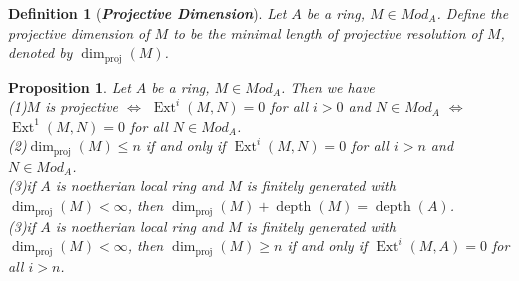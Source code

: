 \documentclass{ctexart}
\newtheorem{definition}{Definition}[section]
\newtheorem{proposition}{Proposition}[section]
\newcommand{\depth}{\operatorname{depth}}
\newcommand{\projdim}{\dim_{\operatorname{proj}}}
\newcommand{\ext}{\operatorname{Ext}}
\begin{document}
\begin{definition}[\textbf{\emph{Projective Dimension}}]
    Let $A$ be a ring, $M\in Mod_{A}$.
    Define the projective dimension of $M$ to be the minimal length of projective resolution of $M$, denoted by $\projdim(M)$.
\end{definition}
\begin{proposition}
    Let $A$ be a ring, $M\in Mod_{A}$.
    Then we have \\
    (1)$M$ is projective $\iff$ $\ext^{i}(M, N) = 0$ for all $i > 0$ and $N\in Mod_{A}$ $\iff$ $\ext^{1}(M, N) = 0$ for all $N\in Mod_{A}$. \\
    (2)$\projdim(M) \le n$ if and only if $\ext^{i}(M, N) = 0$ for all $i > n$ and $N\in Mod_{A}$. \\
    (3)if $A$ is noetherian local ring and $M$ is finitely generated with $\projdim(M) < \infty$,
    then $\projdim(M) + \depth(M) = \depth(A)$. \\
    (3)if $A$ is noetherian local ring and $M$ is finitely generated with $\projdim(M) < \infty$,
    then $\projdim(M) \ge n$ if and only if $\ext^{i}(M, A) = 0$ for all $i > n$.
    \label{Proposition 11.12} 
\end{proposition}
\end{document}
